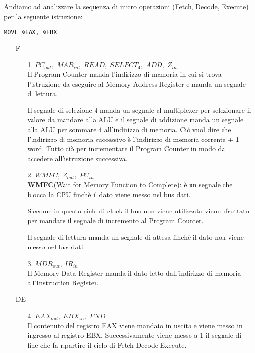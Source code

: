 \documentclass[a4paper]{article}
\theoremstyle{break}
\theoremstyle{break}
\theoremstyle{break}
\theoremstyle{break}
\begin{document}
\begin{example}
	Andiamo ad analizzare la sequenza di micro operazioni (Fetch, Decode, Execute) per la
	seguente istruzione:
	\begin{center}
		\texttt{MOVL \%EAX, \%EBX}
	\end{center}

	\begin{enumerate}
		\item[F]
		      \begin{enumerate}
			      \item[1.] \( PC_{out},\; MAR_{in},\; READ ,\; SELECT_4,\; ADD,\; Z_{in}\) \\
			            Il Program Counter manda l'indirizzo di memoria in cui si trova l'istruzione da eseguire
			            al Memory Address Register e manda un segnale di lettura.

			            Il segnale di selezione 4 manda un segnale al multiplexer per selezionare il valore
			            da mandare alla ALU e il segnale di addizione manda un segnale alla ALU per sommare
			            4 all'indirizzo di memoria. Ciò vuol dire che l'indirizzo di memoria successivo è
			            l'indirizzo di memoria corrente + 1 word. Tutto ciò per incrementare il Program
			            Counter in modo da accedere all'istruzione successiva.

			      \item[2.] \( WMFC,\; Z_{out},\; PC_{in}\)  \\
			            \textbf{WMFC}(Wait for Memory Function to Complete): è un segnale che blocca la CPU finchè il dato viene messo nel bus dati.

			            Siccome in questo ciclo di clock il bus non viene utilizzato viene sfruttato per
			            mandare il segnale di incremento al Program Counter.

			            Il segnale di lettura manda un segnale di attesa finchè il dato non viene messo nel bus dati.
			      \item[3.] \( MDR_{out},\; IR_{in} \) \\
			            Il Memory Data Register manda il dato letto dall'indirizzo di memoria all'Instruction Register.
		      \end{enumerate}

		\item[DE]
		      \begin{enumerate}
			      \item[4.] \( EAX_{out},\; EBX_{in},\; END \) \\
			            Il contenuto del registro EAX viene mandato in uscita e viene messo in ingresso
			            al registro EBX. Successivamente viene messo a 1 il segnale di fine che fa
			            ripartire il ciclo di Fetch-Decode-Execute.
		      \end{enumerate}
	\end{enumerate}
\end{example}
\begin{figure}[H]

\end{figure}
\end{document}

